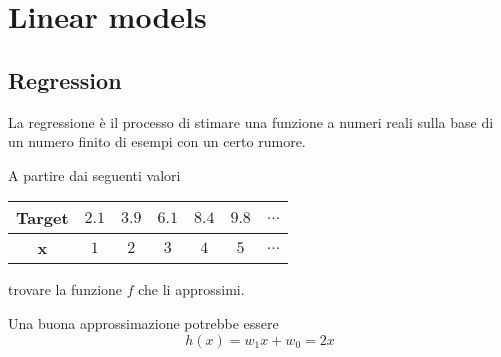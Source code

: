\newpage
\section{Linear models}
\subsection{Regression}
\begin{definition}[Regressione]
	La regressione è il processo di stimare una funzione a numeri reali sulla base di un numero finito di esempi con un certo rumore.
\end{definition}
\begin{example}
	A partire dai seguenti valori
	\begin{table}[!h]
		\centering
		\begin{tabular}{|c|c|c|c|c|c|c|}
			\hline
			\textbf{Target} & $2.1$ & $3.9$ & $6.1$ & $8.4$ & $9.8$ & $\ldots$\\
			\hline
			\textbf{x} & $1$ & $2$ & $3$ & $4$ & $5$ & $\ldots$\\
			\hline
		\end{tabular}
	\end{table}
	trovare la funzione $f$ che li approssimi.
	\begin{center}
	\end{center}
	Una buona approssimazione potrebbe essere
	\begin{equation*}
		h(x)=w_1 x + w_0 = 2x
	\end{equation*}
\end{example}
